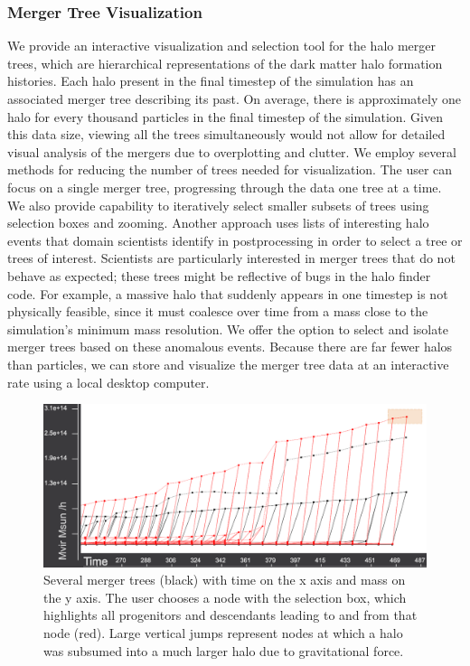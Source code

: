 \subsubsection{Merger Tree Visualization}
We provide an interactive visualization and selection tool for the halo merger trees, which are hierarchical representations of the dark matter halo formation histories. Each halo present in the final timestep of the simulation has an associated merger tree describing its past. On average, there is approximately one halo for every thousand particles in the final timestep of the simulation. Given this data size, viewing all the trees simultaneously would not allow for detailed visual analysis of the mergers due to overplotting and clutter. We employ several methods for reducing the number of trees needed for visualization. The user can focus on a single merger tree, progressing through the data one tree at a time. We also provide capability to iteratively select smaller subsets of trees using selection boxes and zooming. Another approach uses lists of interesting halo events that domain scientists identify in postprocessing in order to select a tree or trees of interest. Scientists are particularly interested in merger trees that do not behave as expected; these trees might be reflective of bugs in the halo finder code. For example, a massive halo that suddenly appears in one timestep is not physically feasible, since it must coalesce over time from a mass close to the simulation's minimum mass resolution. We offer the option to select and isolate merger trees based on these anomalous events. Because there are far fewer halos than particles, we can store and visualize the merger tree data at an interactive rate using a local desktop computer.

	\begin{figure}[t]
		\includegraphics[width=\textwidth]{images/darkmatter/mt_overview.png}
		\caption{Several merger trees (black) with time on the x axis and mass on the y axis. The user chooses a node with the selection box, which highlights all progenitors and descendants leading to and from that node (red). Large vertical jumps represent nodes at which a halo was subsumed into a much larger halo due to gravitational force.}
		\label{fig:mergetreehundred}
	\end{figure}


